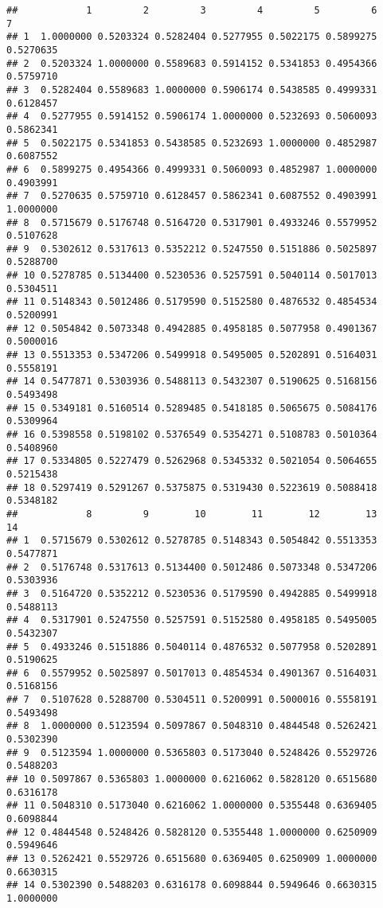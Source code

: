 \documentclass[]{article}
\begin{document}
\begin{verbatim}
##            1         2         3         4         5         6         7
## 1  1.0000000 0.5203324 0.5282404 0.5277955 0.5022175 0.5899275 0.5270635
## 2  0.5203324 1.0000000 0.5589683 0.5914152 0.5341853 0.4954366 0.5759710
## 3  0.5282404 0.5589683 1.0000000 0.5906174 0.5438585 0.4999331 0.6128457
## 4  0.5277955 0.5914152 0.5906174 1.0000000 0.5232693 0.5060093 0.5862341
## 5  0.5022175 0.5341853 0.5438585 0.5232693 1.0000000 0.4852987 0.6087552
## 6  0.5899275 0.4954366 0.4999331 0.5060093 0.4852987 1.0000000 0.4903991
## 7  0.5270635 0.5759710 0.6128457 0.5862341 0.6087552 0.4903991 1.0000000
## 8  0.5715679 0.5176748 0.5164720 0.5317901 0.4933246 0.5579952 0.5107628
## 9  0.5302612 0.5317613 0.5352212 0.5247550 0.5151886 0.5025897 0.5288700
## 10 0.5278785 0.5134400 0.5230536 0.5257591 0.5040114 0.5017013 0.5304511
## 11 0.5148343 0.5012486 0.5179590 0.5152580 0.4876532 0.4854534 0.5200991
## 12 0.5054842 0.5073348 0.4942885 0.4958185 0.5077958 0.4901367 0.5000016
## 13 0.5513353 0.5347206 0.5499918 0.5495005 0.5202891 0.5164031 0.5558191
## 14 0.5477871 0.5303936 0.5488113 0.5432307 0.5190625 0.5168156 0.5493498
## 15 0.5349181 0.5160514 0.5289485 0.5418185 0.5065675 0.5084176 0.5309964
## 16 0.5398558 0.5198102 0.5376549 0.5354271 0.5108783 0.5010364 0.5408960
## 17 0.5334805 0.5227479 0.5262968 0.5345332 0.5021054 0.5064655 0.5215438
## 18 0.5297419 0.5291267 0.5375875 0.5319430 0.5223619 0.5088418 0.5348182
##            8         9        10        11        12        13        14
## 1  0.5715679 0.5302612 0.5278785 0.5148343 0.5054842 0.5513353 0.5477871
## 2  0.5176748 0.5317613 0.5134400 0.5012486 0.5073348 0.5347206 0.5303936
## 3  0.5164720 0.5352212 0.5230536 0.5179590 0.4942885 0.5499918 0.5488113
## 4  0.5317901 0.5247550 0.5257591 0.5152580 0.4958185 0.5495005 0.5432307
## 5  0.4933246 0.5151886 0.5040114 0.4876532 0.5077958 0.5202891 0.5190625
## 6  0.5579952 0.5025897 0.5017013 0.4854534 0.4901367 0.5164031 0.5168156
## 7  0.5107628 0.5288700 0.5304511 0.5200991 0.5000016 0.5558191 0.5493498
## 8  1.0000000 0.5123594 0.5097867 0.5048310 0.4844548 0.5262421 0.5302390
## 9  0.5123594 1.0000000 0.5365803 0.5173040 0.5248426 0.5529726 0.5488203
## 10 0.5097867 0.5365803 1.0000000 0.6216062 0.5828120 0.6515680 0.6316178
## 11 0.5048310 0.5173040 0.6216062 1.0000000 0.5355448 0.6369405 0.6098844
## 12 0.4844548 0.5248426 0.5828120 0.5355448 1.0000000 0.6250909 0.5949646
## 13 0.5262421 0.5529726 0.6515680 0.6369405 0.6250909 1.0000000 0.6630315
## 14 0.5302390 0.5488203 0.6316178 0.6098844 0.5949646 0.6630315 1.0000000

\end{verbatim}
\end{document}

